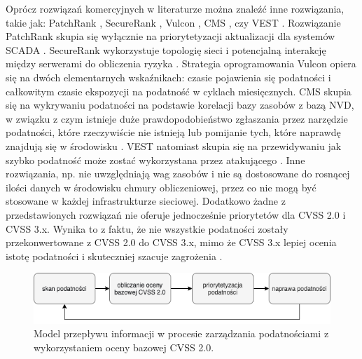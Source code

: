 \bigbreak
Oprócz rozwiązań komercyjnych w literaturze można znaleźć inne rozwiązania, takie jak: PatchRank \cite{yadav2019patchrank}, SecureRank \cite{miura2007securerank}, Vulcon \cite{farris2018vulcon}, CMS \cite{weintraub2016security}, czy VEST \cite{chen2019vest}. Rozwiązanie PatchRank skupia się wyłącznie na priorytetyzacji aktualizacji dla systemów SCADA \cite{yadav2019patchrank}. SecureRank wykorzystuje topologię sieci i potencjalną interakcję między serwerami do obliczenia ryzyka \cite{miura2007securerank}. Strategia oprogramowania Vulcon opiera się na dwóch elementarnych wskaźnikach: czasie pojawienia się podatności i całkowitym czasie ekspozycji na podatność \cite{farris2018vulcon} w cyklach miesięcznych. CMS skupia się na wykrywaniu podatności na podstawie korelacji bazy zasobów z bazą NVD, w związku z czym istnieje duże prawdopodobieństwo zgłaszania przez narzędzie podatności, które rzeczywiście nie istnieją lub pomijanie tych, które naprawdę znajdują się w środowisku \cite{weintraub2016security}. VEST natomiast skupia się na przewidywaniu jak szybko podatność może zostać wykorzystana przez atakującego \cite{chen2019vest}. Inne rozwiązania, np. \cite{yadav2019patchrank, miura2007securerank, farris2018vulcon, chen2019vest} nie uwzględniają wag zasobów i nie są dostosowane do rosnącej ilości danych w środowisku chmury obliczeniowej, przez co nie mogą być stosowane w każdej infrastrukturze sieciowej. Dodatkowo żadne z przedstawionych rozwiązań nie oferuje jednocześnie priorytetów dla CVSS 2.0 i CVSS 3.x. Wynika to z faktu, że nie wszystkie podatności zostały przekonwertowane z CVSS 2.0 do CVSS 3.x, mimo że CVSS 3.x lepiej ocenia istotę podatności i skuteczniej szacuje zagrożenia \cite{fall2019common, Nowak-cldd-2021, Nowa2109Conversion}.

\begin{figure}[!ht]
\centering
\includegraphics[width=.9\textwidth]{Chapters/Wstep/vm-models/vm-model-cvss2.png}
\caption{Model przepływu informacji w procesie zarządzania podatnościami z wykorzystaniem oceny bazowej CVSS 2.0.}
\label{fig:chapter1:vm-model-cvss2}
\end{figure}

